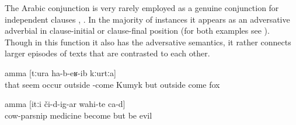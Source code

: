 The Arabic conjunction   is very rarely employed as a genuine conjunction for independent clauses , . In the majority of instances it appears as an adversative adverbial in clause-initial  or clause-final position  (for both examples see ). Though in this function it also has the adversative semantics, it rather connects larger episodes of texts that are contrasted to each other.
%
\begin{exe}
	\ex	\label{ex:‎‎‎He thought that the Kumyk man would come out (of the pit), but a fox came out}
		amma	[tːura	ha-b-eʁ-ib kːurtːa]\\
		that	seem	occur	outside -come	Kumyk		but	outside come	fox\\
	\glt	{}

	\ex	\label{ex:‎‎‎There is this medical cow-parsnip, but if these (plants) get on (the skin), it is bad}
	\gll	[birikːʷa=ra	darman-na	d-irχʷ-ar]	amma	[itːi	či-d-ig-ar	wahi-te	ca-d]\\
		cow-parsnip	medicine	become	but		be	evil \\
	\glt	{}
\end{exe}


